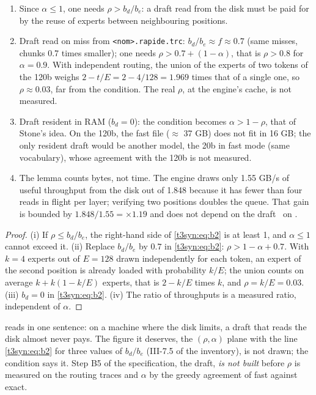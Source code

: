 \begin{corollaire}\label{t3syn:cor:b2}
\begin{enumerate}[label=(\roman*)]
\item Since $\alpha \le 1$, one needs $\rho > b_d/b_e$: a draft read from the disk must be paid for by the reuse of experts between neighbouring positions.
\item Draft read on miss from \texttt{<nom>.rapide.trc}: $b_d/b_e \approx f \approx 0.7$ (same misses, chunks 0.7 times smaller); one needs $\rho > 0.7 + (1 - \alpha)$, that is $\rho > 0.8$ for $\alpha = 0.9$. With independent routing, the union of the experts of two tokens of the 120b weighs $2 - t/E = 2 - 4/128 = 1.969$ times that of a single one, so $\rho \approx 0.03$, far from the condition. The real $\rho$, at the engine's cache, is not measured.
\item Draft resident in RAM ($b_d = 0$): the condition becomes $\alpha > 1 - \rho$, that of Stone's idea. On the 120b, the fast file ($\approx$ 37 GB) does not fit in 16 GB; the only resident draft would be another model, the 20b in fast mode (same vocabulary), whose agreement with the 120b is not measured.
\item The lemma counts bytes, not time. The engine draws only 1.55 GB/s of useful throughput from the disk out of 1.848 because it has fewer than four reads in flight per layer; verifying two positions doubles the queue. That gain is bounded by $1.848/1.55 = \times 1.19$ and does not depend on the draft \calc~on \mes.
\end{enumerate}
\end{corollaire}

\begin{proof}
(i) If $\rho \le b_d/b_e$, the right-hand side of \eqref{t3syn:eq:b2} is at least 1, and $\alpha \le 1$ cannot exceed it. (ii) Replace $b_d/b_e$ by $0.7$ in \eqref{t3syn:eq:b2}: $\rho > 1 - \alpha + 0.7$. With $k = 4$ experts out of $E = 128$ drawn independently for each token, an expert of the second position is already loaded with probability $k/E$; the union counts on average $k + k(1 - k/E)$ experts, that is $2 - k/E$ times $k$, and $\rho = k/E = 0.03$. (iii) $b_d = 0$ in \eqref{t3syn:eq:b2}. (iv) The ratio of throughputs is a measured ratio, independent of $\alpha$.
\end{proof}

 reads in one sentence: on a machine where the disk limits, a draft that reads the disk almost never pays. The figure it deserves, the $(\rho, \alpha)$ plane with the line \eqref{t3syn:eq:b2} for three values of $b_d/b_e$ (III-7.5 of the inventory), is not drawn; the condition says it. Step B5 of the specification, the draft, \emph{is not built} before $\rho$ is measured on the routing traces and $\alpha$ by the greedy agreement of fast against exact.


